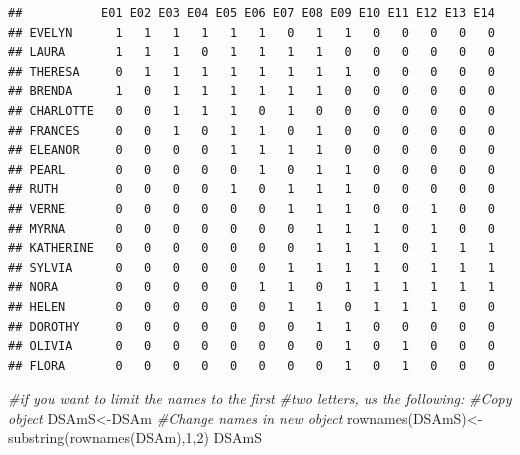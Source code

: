 \documentclass[
  notitlepage,
  onecolumn,
  openany]{book}
\newenvironment{Shaded}{\begin{snugshade}}{\end{snugshade}}
\newcommand{\CommentTok}[1]{\textcolor[rgb]{0.56,0.35,0.01}{\textit{#1}}}
\newcommand{\DecValTok}[1]{\textcolor[rgb]{0.00,0.00,0.81}{#1}}
\newcommand{\FunctionTok}[1]{\textcolor[rgb]{0.00,0.00,0.00}{#1}}
\newcommand{\NormalTok}[1]{#1}
\newcommand{\OtherTok}[1]{\textcolor[rgb]{0.56,0.35,0.01}{#1}}
\begin{document}
\begin{verbatim}
##           E01 E02 E03 E04 E05 E06 E07 E08 E09 E10 E11 E12 E13 E14
## EVELYN      1   1   1   1   1   1   0   1   1   0   0   0   0   0
## LAURA       1   1   1   0   1   1   1   1   0   0   0   0   0   0
## THERESA     0   1   1   1   1   1   1   1   1   0   0   0   0   0
## BRENDA      1   0   1   1   1   1   1   1   0   0   0   0   0   0
## CHARLOTTE   0   0   1   1   1   0   1   0   0   0   0   0   0   0
## FRANCES     0   0   1   0   1   1   0   1   0   0   0   0   0   0
## ELEANOR     0   0   0   0   1   1   1   1   0   0   0   0   0   0
## PEARL       0   0   0   0   0   1   0   1   1   0   0   0   0   0
## RUTH        0   0   0   0   1   0   1   1   1   0   0   0   0   0
## VERNE       0   0   0   0   0   0   1   1   1   0   0   1   0   0
## MYRNA       0   0   0   0   0   0   0   1   1   1   0   1   0   0
## KATHERINE   0   0   0   0   0   0   0   1   1   1   0   1   1   1
## SYLVIA      0   0   0   0   0   0   1   1   1   1   0   1   1   1
## NORA        0   0   0   0   0   1   1   0   1   1   1   1   1   1
## HELEN       0   0   0   0   0   0   1   1   0   1   1   1   0   0
## DOROTHY     0   0   0   0   0   0   0   1   1   0   0   0   0   0
## OLIVIA      0   0   0   0   0   0   0   0   1   0   1   0   0   0
## FLORA       0   0   0   0   0   0   0   0   1   0   1   0   0   0
\end{verbatim}

\begin{Shaded}
\begin{Highlighting}[]
\CommentTok{\#if you want to limit the names to the first }
\CommentTok{\#two letters, us the following:}
\CommentTok{\#Copy object}
\NormalTok{DSAmS}\OtherTok{\textless{}{-}}\NormalTok{DSAm}
\CommentTok{\#Change names in new object}
\FunctionTok{rownames}\NormalTok{(DSAmS)}\OtherTok{\textless{}{-}}\FunctionTok{substring}\NormalTok{(}\FunctionTok{rownames}\NormalTok{(DSAm),}\DecValTok{1}\NormalTok{,}\DecValTok{2}\NormalTok{)}
\NormalTok{DSAmS}
\end{Highlighting}
\end{Shaded}
\end{document}
